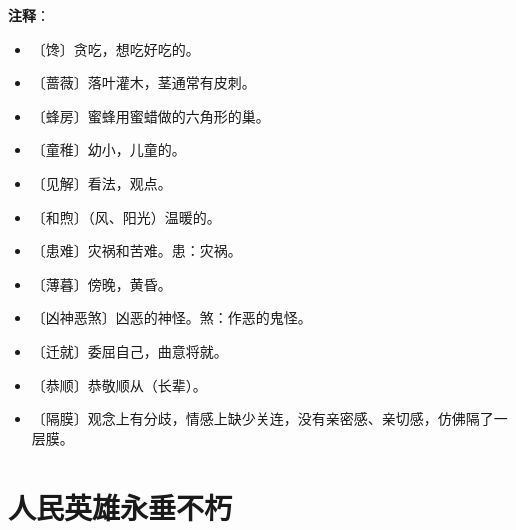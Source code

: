 \documentclass[12pt,UTF-8,openany]{ctexbook}
\begin{document}
\newpage

\textbf{注释}：

\vspace{-1em}

\begin{itemize}
    \setlength\itemsep{-0.2em}
    \item 〔馋〕贪吃，想吃好吃的。
    \item 〔蔷薇〕落叶灌木，茎通常有皮刺。
    \item 〔蜂房〕蜜蜂用蜜蜡做的六角形的巢。
    \item 〔童稚〕幼小，儿童的。
    \item 〔见解〕看法，观点。
    \item 〔和煦〕（风、阳光）温暖的。
    \item 〔患难〕灾祸和苦难。患：灾祸。
    \item 〔薄暮〕傍晚，黄昏。
    \item 〔凶神恶煞〕凶恶的神怪。煞：作恶的鬼怪。
    \item 〔迁就〕委屈自己，曲意将就。
    \item 〔恭顺〕恭敬顺从（长辈）。
    \item 〔隔膜〕观念上有分歧，情感上缺少关连，没有亲密感、亲切感，仿佛隔了一层膜。
\end{itemize}

\chapter{人民英雄永垂不朽}
\end{document}
